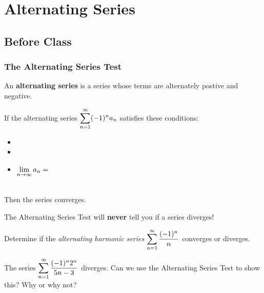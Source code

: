 \documentclass[notes]{subfiles}
\begin{document}
	\fancyhead[LO,RE]{\bfseries \small \currentname}
	\fancyfoot[C]{{}}
	\fancyfoot[RO,LE]{\large \thepage}	%
	
\section*{Alternating Series}\label{cs115}
	\subsection*{Before Class}
	\subsubsection*{The Alternating Series Test}
		\begin{defn}
			An \textbf{alternating series} is a series whose terms are alternately postive and negative.
		\end{defn}
		\begin{rmk}
			If the alternating series $\displaystyle \sum_{n=1}^\infty (-1)^na_n$ satisfies these conditions:\\[15pt]
			\begin{itemize}
				\setlength\itemsep{15pt}
				
				\item {}
				\item {}
				\item $\displaystyle \lim_{n\to\infty }a_n = $
			\end{itemize}\\
			Then the series converges.
		\end{rmk}
		\begin{rmk}[Note]
			The Alternating Series Test will \textbf{never} tell you if a series diverges!
		\end{rmk}
		
		\begin{ex}
			Determine if the \emph{alternating harmonic series} $\displaystyle \sum_{n=1}^\infty \dfrac{(-1)^n}{n}$ converges or diverges.	
		\end{ex}
			\newpage
			
		\begin{ex}
			The series $\displaystyle \sum_{n=1}^\infty \dfrac{(-1)^n2^n}{5n-3}$ diverges.  Can we use the Alternating Series Test to show this?  Why or why not?
		\end{ex}	
			
\end{document}
